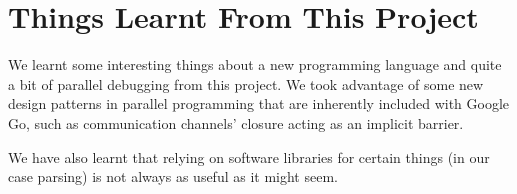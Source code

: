 \documentclass{acm_proc_article-sp}
\begin{document}
\section{Things Learnt From This Project}

We learnt some interesting things about a new programming language and quite a
bit of parallel debugging from this project. We took advantage of some new
design patterns in parallel programming that are inherently included with
Google Go, such as communication channels' closure acting as an implicit
barrier.

We have also learnt that relying on software libraries for certain things (in
our case parsing) is not always as useful as it might seem.
\end{document}
